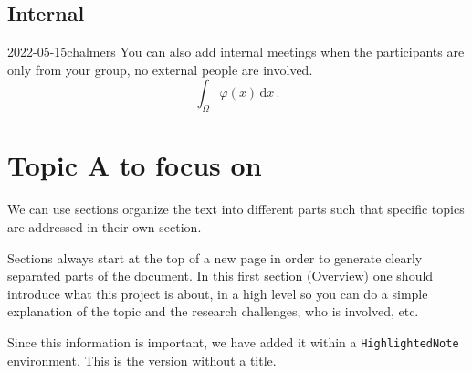 \documentclass{project-logbook}
\begin{document}
	\subsection{Internal}
		\begin{MeetingMinutes}{2022-05-15}{chalmers}
			You can also add internal meetings when the participants are only from your group, no external people are involved.
			\begin{equation}
				\int_{\Omega}{\varphi(x)}\,\mathrm{d}x\,.
			\end{equation}
			\lipsum[1]
		\end{MeetingMinutes}


\section{Topic A to focus on} \label{sec:topic_A}
	We can use sections organize the text into different parts  such that specific topics are addressed in their own section.

	\begin{HighlightedNote}{}
		Sections always start at the top of a new page in order to generate clearly separated parts of the document. In this first section (Overview) one should introduce what this project is about, in a high level so you can do a simple explanation of the topic and the research challenges, who is involved, etc.

		Since this information is important, we have added it within a \texttt{HighlightedNote} environment. This is the version without a title.
	\end{HighlightedNote}
\end{document}
